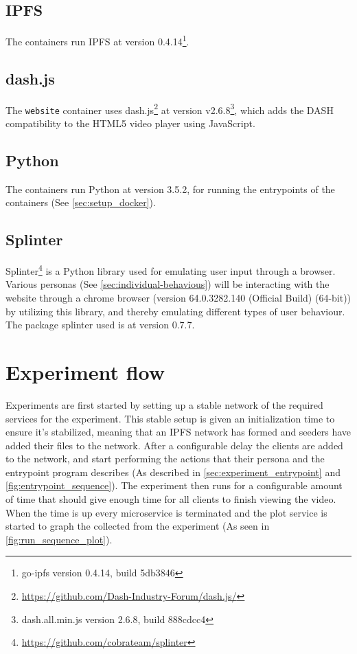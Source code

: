 \subsection{IPFS}
\label{sec:setup_ipfs}
The containers run \acs{IPFS} at version 0.4.14\footnote{go-ipfs version 0.4.14, build 5db3846}.


\subsection{dash.js}
\label{sec:setup_dash.js}
The \texttt{website} container uses dash.js\footnote{\url{https://github.com/Dash-Industry-Forum/dash.js/}} at version v2.6.8\footnote{dash.all.min.js version 2.6.8, build 888cdcc4}, which adds the \ac{DASH} compatibility to the \acs{HTML}5 video player using JavaScript.


\subsection{Python}
\label{sec:setup_python}
The containers run Python at version 3.5.2, for running the entrypoints of the containers (See \autoref{sec:setup_docker}).


\subsection{Splinter}
\label{sec:setup_splinter}
Splinter\footnote{\url{https://github.com/cobrateam/splinter}} is a Python library used for emulating user input through a browser. Various personas (See \autoref{sec:individual-behavious}) will be interacting with the website through a chrome browser (version 64.0.3282.140 (Official Build) (64-bit)) by utilizing this library, and thereby emulating different types of user behaviour.
The package splinter used is at version 0.7.7.



\section{Experiment flow}
Experiments are first started by setting up a stable network of the required services for the experiment. This stable setup is given an initialization time to ensure it's stabilized, meaning that an IPFS network has formed and seeders have added their files to the network.
After a configurable delay the clients are added to the network, and start performing the actions that their persona and the entrypoint program describes (As described in \autoref{sec:experiment_entrypoint} and \autoref{fig:entrypoint_sequence}).
The experiment then runs for a configurable amount of time that should give enough time for all clients to finish viewing the video. When the time is up every microservice is terminated and the plot service is started to graph the collected from the experiment (As seen in \autoref{fig:run_sequence_plot}).

